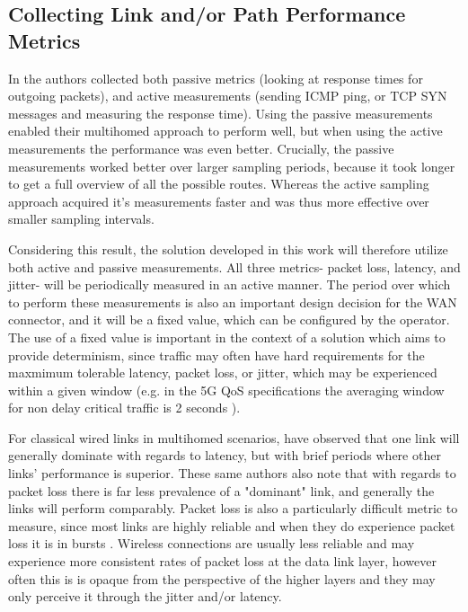 \subsection{Collecting Link and/or Path Performance Metrics}

In \cite{akella2008performance} the authors collected both passive metrics (looking at response times for outgoing packets), and active measurements (sending ICMP ping, or TCP SYN messages and measuring the response time). Using the passive measurements enabled their multihomed approach to perform well, but when using the active measurements the performance was even better. Crucially, the passive measurements worked better over larger sampling periods, because it took longer to get a full overview of all the possible routes. Whereas the active sampling approach acquired it's measurements faster and was thus more effective over smaller sampling intervals.

Considering this result, the solution developed in this work will therefore utilize both active and passive measurements. All three metrics- packet loss, latency, and jitter- will be periodically measured in an active manner. The period over which to perform these measurements is also an important design decision for the WAN connector, and it will be a fixed value, which can be configured by the operator. The use of a fixed value is important in the context of a solution which aims to provide determinism, since traffic may often have hard requirements for the maxmimum tolerable latency, packet loss, or jitter, which may be experienced within a given window (e.g. in the 5G QoS specifications the averaging window for non delay critical traffic is 2 seconds \cite{3gpp.23.501}).

For classical wired links in multihomed scenarios, \cite{tao2004exploring} have observed that one link will generally dominate with regards to latency, but with brief periods where other links' performance is superior. These same authors also note that with regards to packet loss there is far less prevalence of a "dominant" link, and generally the links will perform comparably. Packet loss is also a particularly difficult metric to measure, since most links are highly reliable and when they do experience packet loss it is in bursts \cite{tao2004exploring}. Wireless connections are usually less reliable and may experience more consistent rates of packet loss at the data link layer, however often this is is opaque from the perspective of the higher layers and they may only perceive it through the jitter and/or latency.

